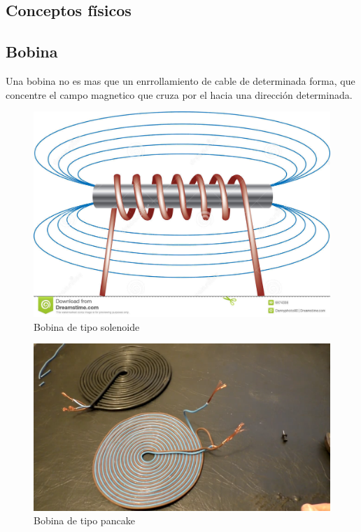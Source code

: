 \documentclass[12pt]{article}
\begin{document}
\subsection{Conceptos físicos}

\subsection{Bobina}
Una bobina no es mas que un enrrollamiento de cable de determinada forma, que concentre el campo magnetico que cruza por el hacia una dirección determinada.

\begin{figure}[H]
\centering
\includegraphics[scale=0.65]{src/images/Solenoide.jpg}
\caption{Bobina de tipo solenoide}
\label{fgr:Solenoide}
\end{figure}

\begin{figure}[H]
\centering
\includegraphics[scale=0.3]{src/images/Pancake.png}
\caption{Bobina de tipo pancake}
\label{fgr:Pancake}
\end{figure}
\end{document}
